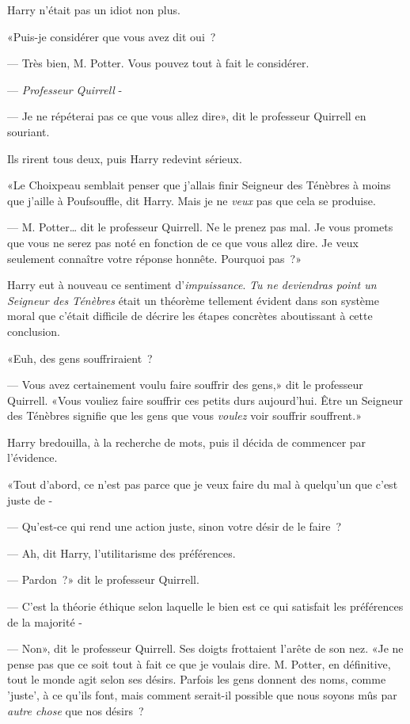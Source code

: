 Harry n'était pas un idiot non plus.

«Puis-je considérer que vous avez dit oui~?

--- Très bien, M. Potter. Vous pouvez tout à fait le considérer.

--- \emph{Professeur Quirrell} -

--- Je ne répéterai pas ce que vous allez dire», dit le professeur Quirrell en souriant.

Ils rirent tous deux, puis Harry redevint sérieux.

«Le Choixpeau semblait penser que j'allais finir Seigneur des Ténèbres à moins que j'aille à Poufsouffle, dit Harry. Mais je ne \emph{veux} pas que cela se produise.

--- M. Potter… dit le professeur Quirrell. Ne le prenez pas mal. Je vous promets que vous ne serez pas noté en fonction de ce que vous allez dire. Je veux seulement connaître votre réponse honnête. Pourquoi pas~?»

Harry eut à nouveau ce sentiment d'\emph{impuissance}. \emph{Tu ne deviendras point un Seigneur des Ténèbres} était un théorème tellement évident dans son système moral que c'était difficile de décrire les étapes concrètes aboutissant à cette conclusion.

«Euh, des gens souffriraient~?

--- Vous avez certainement voulu faire souffrir des gens,» dit le professeur Quirrell. «Vous vouliez faire souffrir ces petits durs aujourd'hui. Être un Seigneur des Ténèbres signifie que les gens que vous \emph{voulez} voir souffrir souffrent.»

Harry bredouilla, à la recherche de mots, puis il décida de commencer par l'évidence.

«Tout d'abord, ce n'est pas parce que je veux faire du mal à quelqu'un que c'est juste de -

--- Qu'est-ce qui rend une action juste, sinon votre désir de le faire~?

--- Ah, dit Harry, l'utilitarisme des préférences.

--- Pardon~?» dit le professeur Quirrell.

--- C'est la théorie éthique selon laquelle le bien est ce qui satisfait les préférences de la majorité -

--- Non», dit le professeur Quirrell. Ses doigts frottaient l'arête de son nez. «Je ne pense pas que ce soit tout à fait ce que je voulais dire. M. Potter, en définitive, tout le monde agit selon ses désirs. Parfois les gens donnent des noms, comme 'juste', à ce qu'ils font, mais comment serait-il possible que nous soyons mûs par \emph{autre chose} que nos désirs~?

